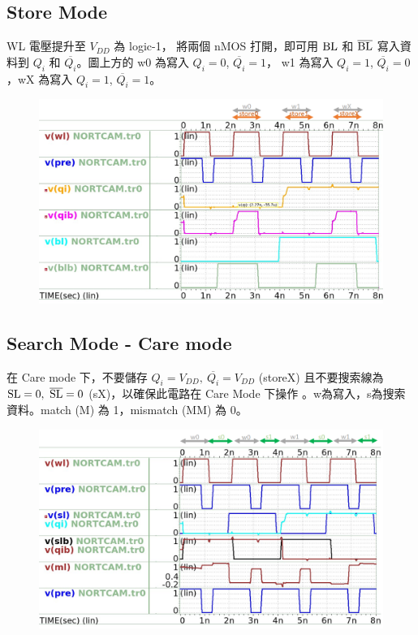 \documentclass{article}
\begin{document}
\subsection{Store Mode}

WL 電壓提升至 $V_{DD}$ 為 logic-1， 將兩個 nMOS 打開，即可用 $\rm BL$ 和 $\rm \overline{BL}$ 寫入資料到 $Q_i$ 和 $\overline{Q_i}$。圖上方的 w0 為寫入 $Q_i = 0$, $\overline{Q_i} = 1$， w1 為寫入 $Q_i = 1$, $\overline{Q_i} = 0$，wX 為寫入 $Q_i = 1$, $\overline{Q_i} = 1$。


\begin{figure}[H]
\centering
\includegraphics[width=\linewidth]{./img/2023-12-14-00-04-36.png}
\end{figure}


\subsection{Search Mode - Care mode}

在 Care mode 下，不要儲存 $Q_i = V_{DD},\ \overline{Q_i} = V_{DD}$ (storeX) 且不要搜索線為 $\rm SL = 0,\ \overline{SL} = 0$ (sX)，以確保此電路在 Care Mode 下操作
。w為寫入，s為搜索資料。match (M) 為 1，mismatch (MM) 為 0。



\begin{figure}[H]
  \centering
  \includegraphics[width=\linewidth]{./img/2023-12-14-00-20-00.png}
  \end{figure}
\end{document}
